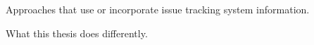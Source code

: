 \cite{servant_history_2012}
\cite{kawrykow_non-essential_2011}
\cite{bradley_supporting_2011}
\cite{grund_codeshovel_2021}

Approaches that use or incorporate issue tracking system information.

\cite{cubranic_hipikat_2005}
\cite{rastkar_why_2013}
\cite{moreno_arena_2017}


What this thesis does differently.

\endinput

Any text after an \endinput is ignored.
You could put scraps here or things in progress.